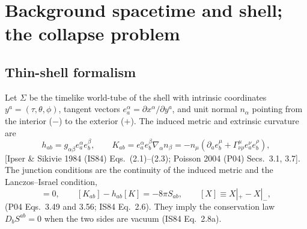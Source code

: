 \documentclass[11pt,a4paper]{article}
\numberwithin{equation}{section}
\begin{document}
\section{Background spacetime and shell; the collapse problem}\label{sec:bg}

\subsection{Thin-shell formalism}
Let $\Sigma$ be the timelike world-tube of the shell with intrinsic coordinates $y^a=(\tau,\theta,\phi)$,
tangent vectors $e^\alpha_a=\partial x^\alpha/\partial y^a$, and unit normal $n_\alpha$ pointing from the
interior ($-$) to the exterior ($+$). The induced metric and extrinsic curvature are
\begin{equation}
h_{ab}=g_{\alpha\beta}e^\alpha_ae^\beta_b,\qquad
K_{ab}=e^\alpha_ae^\beta_b\nabla_\alpha n_\beta=-n_\mu\left(\partial_ae^\mu_b+\Gamma^\mu_{\nu\rho}e^\nu_ae^\rho_b\right),
\label{eq:Kab}
\end{equation}
[Ipser \& Sikivie 1984 (IS84) Eqs.~(2.1)--(2.3); Poisson 2004 (P04) Secs.~3.1, 3.7]. The junction conditions
are the continuity of the induced metric and the Lanczos--Israel condition,
\begin{equation}
[h_{ab}]=0,\qquad [K_{ab}]-h_{ab}[K]=-8\pi S_{ab},\qquad [X]\equiv X|_{+}-X|_{-},
\label{eq:israel}
\end{equation}
(P04 Eqs.~3.49 and 3.56; IS84 Eq.~2.6). They imply the conservation law $D_bS^{ab}=0$ when the two sides are
vacuum (IS84 Eq.~2.8a).
\end{document}
